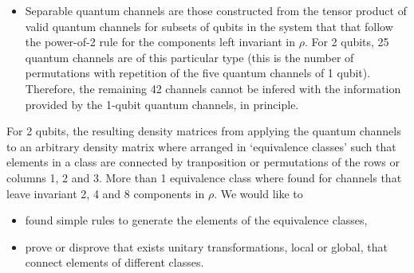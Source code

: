 \documentclass[11pt,dvipsnames]{article}
\begin{document}
\begin{itemize}
%


	\item Separable quantum channels are those constructed from the tensor product
				of valid quantum channels for subsets of qubits in the system that
				that follow the 
				power-of-2 rule for the components left invariant in $\rho$. For 2
				qubits, 25 quantum channels are of this particular type (this is the
				number of permutations with repetition of the five 
				quantum channels of 1 qubit). Therefore, the remaining 42 channels
				cannot be infered with the information provided by the 1-qubit
				quantum channels, in principle.
\end{itemize}

For 2 qubits, 
the resulting density matrices from applying the quantum channels
to an arbitrary density matrix where arranged in `equivalence classes' 
such that elements in a class are connected by tranposition or 
permutations of the rows or columns 1, 2 and 3. More than 1 equivalence class
where found for channels that leave invariant 2, 4 and 8 components in $\rho$.
We would like to
\begin{itemize}
	\item found simple rules to generate the elements 
				of the equivalence classes,
	\item prove or disprove that exists unitary transformations, local or global,
				that connect elements of different classes.
\end{itemize}









\vfill
\end{document}
